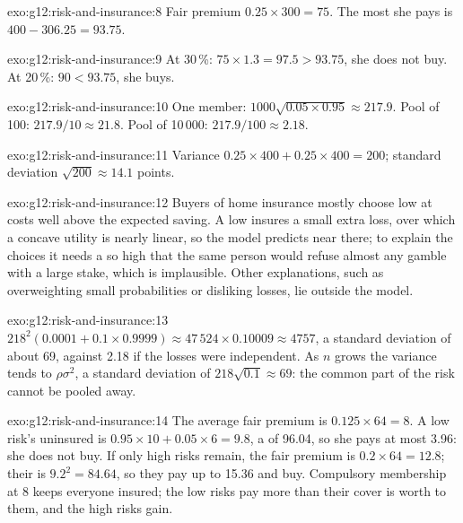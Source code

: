 \begin{solution}{exo:g12:risk-and-insurance:8}
Fair premium $0.25 \times 300 = 75$. The most she pays is $400 - 306.25 = 93.75$.
\end{solution}

\begin{solution}{exo:g12:risk-and-insurance:9}
At 30\,\%: $75 \times 1.3 = 97.5 > 93.75$, she does not buy. At 20\,\%: $90 < 93.75$, she buys.
\end{solution}

\begin{solution}{exo:g12:risk-and-insurance:10}
One member: $1000\sqrt{0.05 \times 0.95} \approx 217.9$. Pool of 100: $217.9/10 \approx 21.8$. Pool of 10\,000: $217.9/100 \approx 2.18$.
\end{solution}

\begin{solution}{exo:g12:risk-and-insurance:11}
Variance $0.25 \times 400 + 0.25 \times 400 = 200$; standard deviation $\sqrt{200} \approx 14.1$ points.
\end{solution}

\begin{solution}{exo:g12:risk-and-insurance:12}
Buyers of home insurance mostly choose low  at costs well above the expected saving. A low  insures a small extra loss, over which a concave utility is
nearly linear, so the model predicts near  there; to explain the choices it needs a  so high that the same person would refuse almost any
gamble with a large stake, which is implausible. Other explanations, such as overweighting small probabilities or disliking losses, lie outside the model.
\end{solution}

\begin{solution}{exo:g12:risk-and-insurance:13}
$218^2 (0.0001 + 0.1 \times 0.9999) \approx 47\,524 \times 0.10009 \approx 4757$, a standard deviation of about 69, against 2.18 if the losses were independent. As $n$ grows
the variance tends to $\rho\sigma^2$, a standard deviation of $218\sqrt{0.1} \approx 69$: the common part of the risk cannot be pooled away.
\end{solution}

\begin{solution}{exo:g12:risk-and-insurance:14}
The average fair premium is $0.125 \times 64 = 8$. A low risk's  uninsured is $0.95 \times 10 + 0.05 \times 6 = 9.8$, a  of 96.04, so she
pays at most 3.96: she does not buy. If only high risks remain, the fair premium is $0.2 \times 64 = 12.8$; their  is $9.2^2 = 84.64$, so they pay up to
15.36 and buy. Compulsory membership at 8 keeps everyone insured; the low risks pay more than their cover is worth to them, and the high risks gain.
\end{solution}

